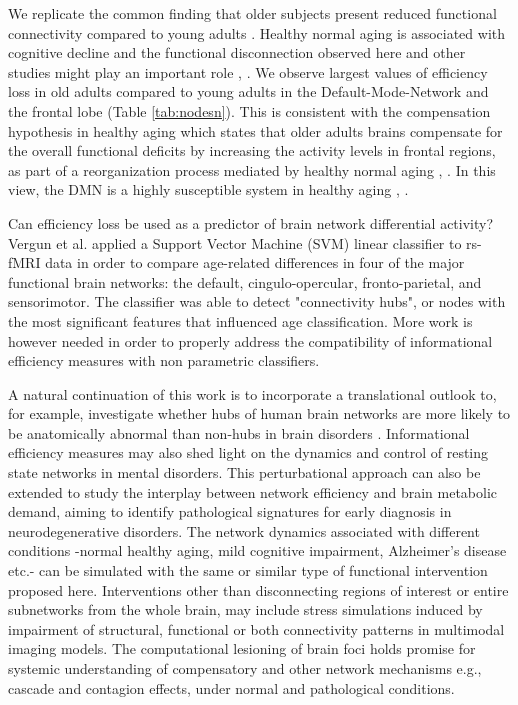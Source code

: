 \documentclass[12pt,a4paper]{article}
\begin{document}
We replicate the common finding that older subjects present reduced functional connectivity compared to young adults \cite{sala-llonch_changes_2014}. Healthy normal aging is associated with cognitive decline and the functional disconnection observed here and other studies might play an important role \cite{ferreira_resting-state_2013}, \cite{dennis_functional_2014}.  
We observe largest values of efficiency loss in old adults compared to young adults in the Default-Mode-Network and the frontal lobe (Table \ref{tab:nodesn}).
This is consistent with the compensation hypothesis in healthy aging which states that older adults brains compensate for the overall functional deficits by increasing the activity levels in frontal regions, as part of a reorganization process mediated by healthy normal aging \cite{cabeza_aging_2002}, \cite{park_adaptive_2009}. In this view, the DMN is a highly susceptible system in healthy aging \cite{betzel_changes_2014}, \cite{onoda_decreased_2012}. 

Can efficiency loss be used as a predictor of brain network differential activity? 
Vergun et al. \cite{vergun_characterizing_2013} applied a Support Vector Machine (SVM) linear classifier to rs-fMRI data in order to compare age-related differences in four of the major functional brain networks: the default, cingulo-opercular, fronto-parietal, and sensorimotor. 
The classifier was able to detect "connectivity hubs", or nodes with the most significant features that influenced age classification. More work is however needed in order to properly address the compatibility of informational efficiency measures with non parametric classifiers. 

A natural continuation of this work is to incorporate a translational outlook to, for example, investigate whether hubs of human brain networks are more likely to be anatomically abnormal than non-hubs in brain disorders \cite{crossley_hubs_2014}. Informational efficiency measures may also shed light on the dynamics and control of resting state networks in mental disorders. 
This perturbational approach can also be extended to study the interplay between network efficiency and brain metabolic demand, aiming to identify pathological signatures for early diagnosis in neurodegenerative disorders. The network dynamics associated with different conditions -normal healthy aging, mild cognitive impairment, Alzheimer's disease etc.- can be simulated with the same or similar type of functional intervention proposed here. Interventions other than disconnecting regions of interest or entire subnetworks from the whole brain, may include stress simulations induced by impairment of structural, functional or both connectivity patterns in multimodal imaging models. The computational lesioning of brain foci holds promise for systemic understanding of compensatory and other network mechanisms e.g., cascade and contagion effects, under normal and pathological conditions.   



\end{document}
